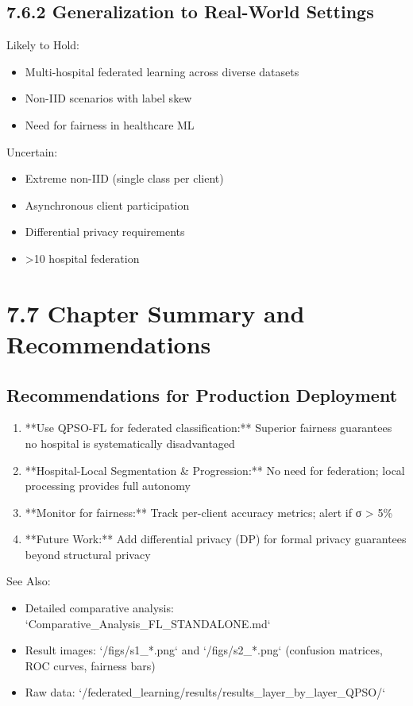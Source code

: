 \subsection{7.6.2 Generalization to Real-World Settings}
Likely to Hold:

\begin{itemize}
  \item Multi-hospital federated learning across diverse datasets
  \item Non-IID scenarios with label skew
  \item Need for fairness in healthcare ML
\end{itemize}

Uncertain:

\begin{itemize}
  \item Extreme non-IID (single class per client)
  \item Asynchronous client participation
  \item Differential privacy requirements
  \item >10 hospital federation
\end{itemize}


\section{7.7 Chapter Summary and Recommendations}

\subsection{Recommendations for Production Deployment}
\begin{enumerate}
  \item **Use QPSO-FL for federated classification:** Superior fairness guarantees no hospital is systematically disadvantaged
  \item **Hospital-Local Segmentation \& Progression:** No need for federation; local processing provides full autonomy
  \item **Monitor for fairness:** Track per-client accuracy metrics; alert if σ > 5\%
  \item **Future Work:** Add differential privacy (DP) for formal privacy guarantees beyond structural privacy
\end{enumerate}

See Also:

\begin{itemize}
  \item Detailed comparative analysis: `Comparative\_Analysis\_FL\_STANDALONE.md`
  \item Result images: `/figs/s1\_*.png` and `/figs/s2\_*.png` (confusion matrices, ROC curves, fairness bars)
  \item Raw data: `/federated\_learning/results/results\_layer\_by\_layer\_QPSO/`
\end{itemize}


